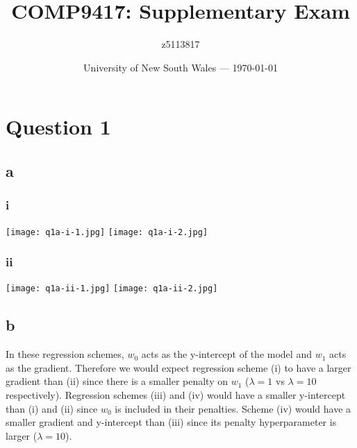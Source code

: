\documentclass{article}
\title{COMP9417: Supplementary Exam} %
\author{z5113817} %
\date{University of New South Wales --- \today} %
\begin{document}




\section*{Question 1}

\subsection*{a}

\subsubsection*{i}
\texttt{[image: q1a-i-1.jpg]}
\newpage
\texttt{[image: q1a-i-2.jpg]}

\newpage
\subsubsection*{ii}
\texttt{[image: q1a-ii-1.jpg]}
\newpage
\texttt{[image: q1a-ii-2.jpg]}

\subsection*{b}

In these regression schemes, \(w_{0}\) acts as the y-intercept of the model and \(w_{1}\) acts as the gradient. Therefore we would expect 
regression scheme (i) to have a larger gradient than (ii) since there is a smaller penalty on \(w_{1}\) (\(\lambda = 1\) vs \(\lambda = 10\) respectively).
Regression schemes (iii) and (iv) would have a smaller y-intercept than (i) and (ii) since \(w_{0}\) is included in their penalties. Scheme (iv) would have 
a smaller gradient and y-intercept than (iii) since its penalty hyperparameter is larger (\(\lambda = 10\)).\\
\end{document}
